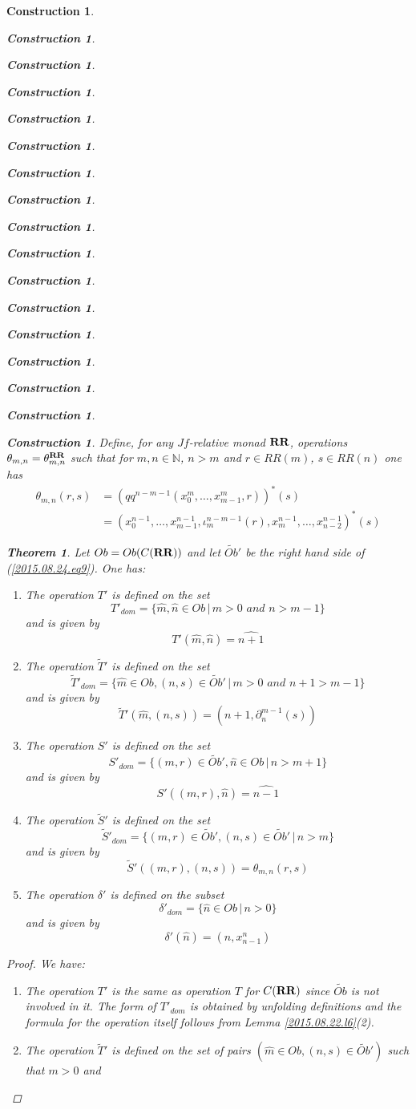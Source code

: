 \documentclass[onecolumn,12pt]{amsart}
\newtheorem{theorem}[proposition]{Theorem}
\numberwithin{proposition}{subsection}
\newtheorem{construction}[proposition]{Construction}
\newcommand{\nn}{{\mathbb N}}
\newcommand{\nat}{\nn}
\newcommand{\wt}{\widetilde}
\newcommand{\wh}{\widehat}
\newcommand{\mbind}[1]{{#1^*}}
\newcommand{\RR}{{\bf RR}}
\begin{document}
\begin{construction}
\begin{construction}
\begin{construction}
\begin{construction}
\begin{construction}
\begin{construction}
\begin{construction}
\begin{construction}
\begin{construction}
\begin{construction}
\begin{construction}
\begin{construction}
\begin{construction}
\begin{construction}
\begin{construction}
\begin{construction}
\begin{construction}
Define, for any $Jf$-relative monad $\RR$, operations
$\theta_{m,n}=\theta^{\RR}_{m,n}$ such that for $m,n\in\nat$, $n>m$ and $r\in
RR(m)$, $s\in RR(n)$ one has
%
\begin{equation}
  \label{2015.09.07.eq1}
  \begin{split}
    \theta_{m,n}(r,s)&=\mbind{(qq^{n-m-1}(x_0^m,\dots,x_{m-1}^m,r))}(s) \\
    &=\mbind{(x_0^{n-1},\dots,x_{m-1}^{n-1},\iota_{m}^{n-m-1}(r),x_m^{n-1},\dots,x_{n-2}^{n-1})}(s)
  \end{split}
\end{equation}%
%
\begin{theorem}
\label{2015.08.26.th1}
Let $Ob=Ob(C(\RR))$ and let $\wt{Ob}'$ be the right hand side of (\ref{2015.08.24.eq9}). One has:
%
\begin{enumerate}
\item The operation $T'$ is defined on the set
%
$$T'_{dom}=\{\wh{m},\wh{n}\in Ob\,|\,m>0\,\,and\,\,n>m-1\}$$
%
and is given by 
%
$$T'(\wh{m},\wh{n})=\wh{n+1}$$
%
\item The operation $\wt{T}'$ is defined on the set 
%
$$\wt{T}'_{dom}=\{\wh{m}\in Ob, (n,s)\in \wt{Ob}'\,|\,m>0\,\,and\,\,n+1>m-1\}$$
%
and is given by
%
$$\wt{T}'(\wh{m},(n,s))=(n+1,\partial_n^{m-1}(s))$$
%
\item The operation $S'$ is defined on the set
%
$$S'_{dom}=\{(m,r)\in \wt{Ob}',\wh{n}\in Ob\,|\,n>m+1\}$$
%
and is given by
%
$$S'((m,r),\wh{n})=\wh{n-1}$$
%
\item The operation $\wt{S}'$ is defined on the set 
%
$$\wt{S}'_{dom}=\{(m,r)\in\wt{Ob}',(n,s)\in \wt{Ob}'\,|\,n>m\}$$
%
and is given by
%
$$\wt{S}'((m,r),(n,s))=\theta_{m,n}(r,s)$$
%
\item The operation $\delta'$ is defined on the subset
%
$$\delta'_{dom}=\{\wh{n}\in Ob\,|\,n>0\}$$
%
and is given by
%
$$\delta'(\wh{n})=(n,x_{n-1}^n)$$
%
\end{enumerate}
\end{theorem}
%
\begin{proof}
We have:
%
\begin{enumerate}
%
\item The operation $T'$ is the same as operation $T$ for $C(\RR)$ since $\wt{Ob}$
  is not involved in it. The form of $T'_{dom}$ is obtained by unfolding
  definitions and the formula for the operation itself follows from Lemma
  \ref{2015.08.22.l6}(2).
%
\item The operation $\wt{T}'$ is defined on the set of pairs $(\wh{m}\in Ob,
  (n,s)\in \wt{Ob}')$ such that $m>0$ and

\end{enumerate}
\end{proof}
\end{construction}
\end{construction}
\end{construction}
\end{construction}
\end{construction}
\end{construction}
\end{construction}
\end{construction}
\end{construction}
\end{construction}
\end{construction}
\end{construction}
\end{construction}
\end{construction}
\end{construction}
\end{construction}
\end{construction}
\end{document}
